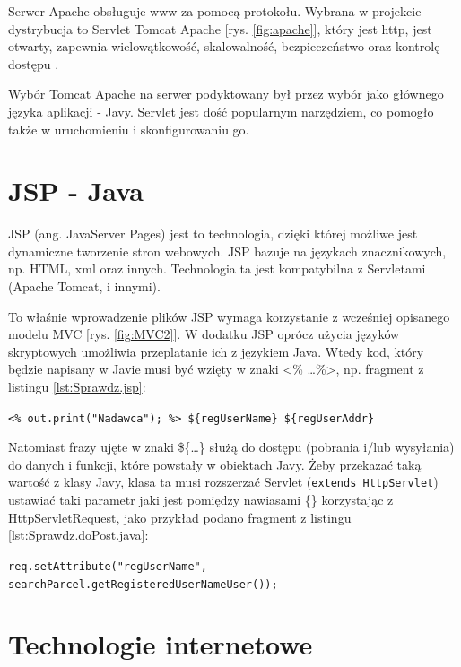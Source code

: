 \documentclass[eng,printmode,oneside]{mgr}
\begin{document}
Serwer Apache obsługuje www za pomocą protokołu. Wybrana w projekcie dystrybucja
to Servlet Tomcat Apache [rys. \ref{fig:apache}], który jest http, jest otwarty,
zapewnia wielowątkowość, skalowalność, bezpieczeństwo oraz kontrolę dostępu
\cite{apache.wiki}.

Wybór Tomcat Apache na serwer podyktowany był przez wybór jako głównego języka
aplikacji - Javy. Servlet jest dość popularnym narzędziem, co pomogło także w
uruchomieniu i skonfigurowaniu go.

\section{JSP - Java}

JSP (ang. JavaServer Pages) jest to technologia, dzięki której możliwe jest
dynamiczne tworzenie stron webowych. JSP bazuje na językach znacznikowych, np.
HTML, xml oraz innych. Technologia ta jest kompatybilna z Servletami (Apache
Tomcat, i innymi).

To właśnie wprowadzenie plików JSP wymaga korzystanie z wcześniej
opisanego modelu MVC [rys. \ref{fig:MVC2}]. W dodatku JSP oprócz użycia języków
skryptowych umożliwia przeplatanie ich z językiem Java. Wtedy kod, który będzie
napisany w Javie musi być wzięty w znaki <\% \ldots \%>, np. fragment z listingu
\ref{lst:Sprawdz.jsp}:

\texttt{<\% out.print("Nadawca"); \%> \$\{regUserName\}
\$\{regUserAddr\}}

Natomiast frazy ujęte w znaki \$\{\ldots\} służą do dostępu (pobrania
i/lub wysyłania) do danych i funkcji, które powstały w obiektach Javy. Żeby
przekazać taką wartość z klasy Javy, klasa ta musi rozszerzać Servlet
(\texttt{extends HttpServlet}) ustawiać taki parametr jaki jest pomiędzy
nawiasami \{\} korzystając z HttpServletRequest, jako przykład podano fragment z
listingu \ref{lst:Sprawdz.doPost.java}:

\texttt{req.setAttribute("regUserName",
						searchParcel.getRegisteredUserNameUser());}

\section{Technologie internetowe}
\end{document}
